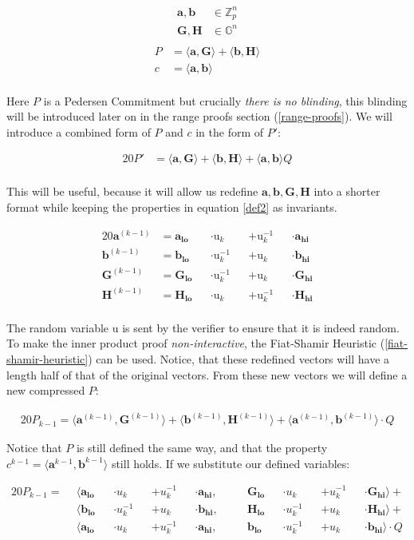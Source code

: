 \documentclass{article}
\newcommand{\eq}[1]{\begin{alignat*}{20}#1\end{alignat*}}
\newcommand{\eqn}[2]{\begin{equation}\label{#1}\begin{split}#2\end{split}\end{equation}}
\renewcommand{\vec}[1]{\boldsymbol{#1}}
\newcommand{\ran}[1]{\mathrm{#1}}
\newcommand{\G}{\mathbb{G}}
\newcommand{\Z}{\mathbb{Z}}
\newcommand{\dotp}[2]{\langle #1, #2 \rangle}
\newcommand{\opn}[1]{\operatorname{#1}}
\newcommand{\veclo}[1]{\vec{#1_{\opn{lo}}}}
\newcommand{\vechi}[1]{\vec{#1_{\opn{hi}}}}
\begin{document}
\eqn{def1}{
	\vec{a}, \vec{b} &\in \Z^n_p \\
	\vec{G}, \vec{H} &\in \G^n \\
}
\eqn{def2}{
	P &= \dotp{\vec{a}}{\vec{G}} + \dotp{\vec{b}}{\vec{H}} \\
	c &= \dotp{\vec{a}}{\vec{b}} \\
}

Here $P$ is a Pedersen Commitment but crucially \textit{there is no
blinding}, this blinding will be introduced later on in the range proofs
section (\ref{range-proofs}). We will introduce a combined form of $P$
and $c$ in the form of $P'$:

\eq{
	P' &= \dotp{\vec{a}}{\vec{G}} +
	      \dotp{\vec{b}}{\vec{H}} +
	      \dotp{\vec{a}}{\vec{b}}Q \\
}

This will be useful, because it will allow us redefine $\vec{a},
\vec{b}, \vec{G}, \vec{H}$ into a shorter format while keeping the
properties in equation \ref{def2} as invariants.

\eq{
	\vec{a}^{(k-1)} &= \veclo{a} &&\cdot \ran{u}_k      &&+ \ran{u}^{-1}_k &&\cdot \vechi{a} \\
	\vec{b}^{(k-1)} &= \veclo{b} &&\cdot \ran{u}^{-1}_k &&+ \ran{u}_k      &&\cdot \vechi{b} \\
	\vec{G}^{(k-1)} &= \veclo{G} &&\cdot \ran{u}^{-1}_k &&+ \ran{u}_k      &&\cdot \vechi{G} \\
	\vec{H}^{(k-1)} &= \veclo{H} &&\cdot \ran{u}_k      &&+ \ran{u}^{-1}_k &&\cdot \vechi{H} \\
}

The random variable $\ran{u}$ is sent by the verifier to
ensure that it is indeed random. To make the inner product
proof \textit{non-interactive}, the Fiat-Shamir Heuristic
(\ref{fiat-shamir-heuristic}) can be used.  Notice, that these redefined
vectors will have a length half of that of the original vectors. From
these new vectors we will define a new compressed $P$:

\eq{
	P_{k-1} =
	\dotp{\vec{a}^{(k-1)}}{\vec{G}^{(k-1)}} +
	\dotp{\vec{b}^{(k-1)}}{\vec{H}^{(k-1)}} +
	\dotp{\vec{a}^{(k-1)}}{\vec{b}^{(k-1)}} \cdot Q
}

Notice that $P$ is still defined the same way, and that the property
$c^{k-1} = \dotp{\vec{a}^{k-1}}{\vec{b}^{k-1}}$ still holds. If we
substitute our defined variables:

\eq{
	P_{k-1} = \: \:
	&\dotp
		{        \veclo{a} &&\cdot u_k      &&+ u_k^{-1} &&\cdot \vechi{a}}
		{&&\quad \veclo{G} &&\cdot u_k      &&+ u_k^{-1} &&\cdot \vechi{G}}
	+ \\
	&\dotp
		{        \veclo{b} &&\cdot u_k^{-1} &&+ u_k      &&\cdot \vechi{b}}
		{&&\quad \veclo{H} &&\cdot u_k^{-1} &&+ u_k      &&\cdot \vechi{H}}
	+ \\
	&\dotp
		{        \veclo{a} &&\cdot u_k      &&+ u_k^{-1} &&\cdot \vechi{a}}
		{&&\quad \veclo{b} &&\cdot u_k^{-1} &&+ u_k      &&\cdot \vechi{b}}
	\cdot Q \\
}
\end{document}
